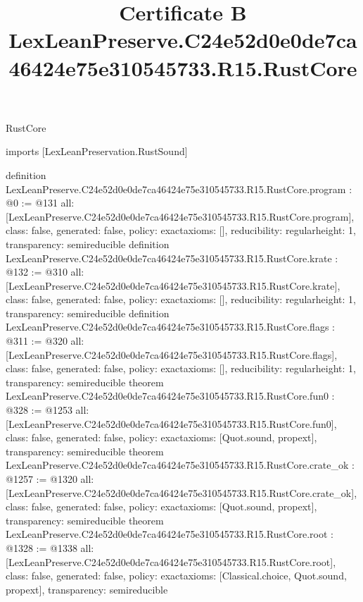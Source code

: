 \begin{lexlean}{RustCore}
\title{Certificate B LexLeanPreserve.C24e52d0e0de7ca46424e75e310545733.R15.RustCore}
\begin{coremodule}
imports [LexLeanPreservation.RustSound]

definition LexLeanPreserve.C24e52d0e0de7ca46424e75e310545733.R15.RustCore.program : @0 := @131 {
  all: [LexLeanPreserve.C24e52d0e0de7ca46424e75e310545733.R15.RustCore.program],
  class: false,
  generated: false,
  policy: exact{axioms: []},
  reducibility: regular{height: 1},
  transparency: semireducible
}
definition LexLeanPreserve.C24e52d0e0de7ca46424e75e310545733.R15.RustCore.krate : @132 := @310 {
  all: [LexLeanPreserve.C24e52d0e0de7ca46424e75e310545733.R15.RustCore.krate],
  class: false,
  generated: false,
  policy: exact{axioms: []},
  reducibility: regular{height: 1},
  transparency: semireducible
}
definition LexLeanPreserve.C24e52d0e0de7ca46424e75e310545733.R15.RustCore.flags : @311 := @320 {
  all: [LexLeanPreserve.C24e52d0e0de7ca46424e75e310545733.R15.RustCore.flags],
  class: false,
  generated: false,
  policy: exact{axioms: []},
  reducibility: regular{height: 1},
  transparency: semireducible
}
theorem LexLeanPreserve.C24e52d0e0de7ca46424e75e310545733.R15.RustCore.fun0 : @328 := @1253 {
  all: [LexLeanPreserve.C24e52d0e0de7ca46424e75e310545733.R15.RustCore.fun0],
  class: false,
  generated: false,
  policy: exact{axioms: [Quot.sound, propext]},
  transparency: semireducible
}
theorem LexLeanPreserve.C24e52d0e0de7ca46424e75e310545733.R15.RustCore.crate_ok : @1257 := @1320 {
  all: [LexLeanPreserve.C24e52d0e0de7ca46424e75e310545733.R15.RustCore.crate_ok],
  class: false,
  generated: false,
  policy: exact{axioms: [Quot.sound, propext]},
  transparency: semireducible
}
theorem LexLeanPreserve.C24e52d0e0de7ca46424e75e310545733.R15.RustCore.root : @1328 := @1338 {
  all: [LexLeanPreserve.C24e52d0e0de7ca46424e75e310545733.R15.RustCore.root],
  class: false,
  generated: false,
  policy: exact{axioms: [Classical.choice, Quot.sound, propext]},
  transparency: semireducible
}


\end{coremodule}
\end{lexlean}
